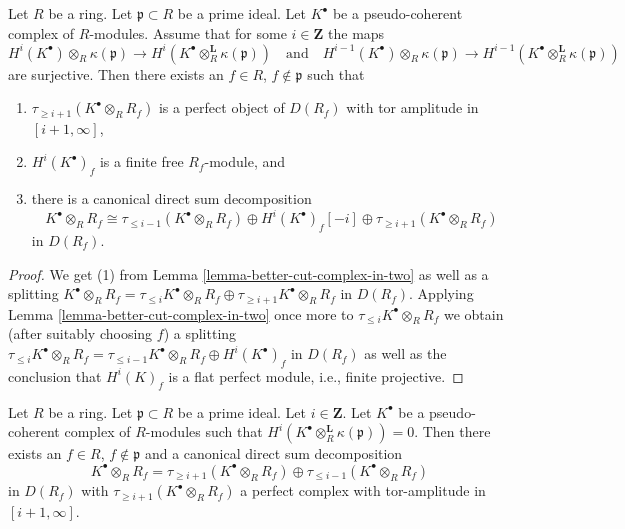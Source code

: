 \begin{lemma}
\label{lemma-isolate-a-cohomology-group}
Let $R$ be a ring. Let $\mathfrak p \subset R$ be a prime ideal.
Let $K^\bullet$ be a pseudo-coherent complex of $R$-modules.
Assume that for some $i \in \mathbf{Z}$ the maps
$$
H^i(K^\bullet) \otimes_R \kappa(\mathfrak p)
\longrightarrow
H^i(K^\bullet \otimes_R^{\mathbf{L}} \kappa(\mathfrak p))
\quad\text{and}\quad
H^{i - 1}(K^\bullet) \otimes_R \kappa(\mathfrak p)
\longrightarrow
H^{i - 1}(K^\bullet \otimes_R^{\mathbf{L}} \kappa(\mathfrak p))
$$
are surjective. Then there exists an $f \in R$, $f \not \in \mathfrak p$
such that
\begin{enumerate}
\item $\tau_{\geq i + 1}(K^\bullet \otimes_R R_f)$ is a perfect
object of $D(R_f)$ with tor amplitude in $[i + 1, \infty]$,
\item $H^i(K^\bullet)_f$ is a finite free $R_f$-module, and
\item there is a canonical direct sum decomposition
$$
K^\bullet \otimes_R R_f \cong
\tau_{\leq i - 1}(K^\bullet \otimes_R R_f) \oplus
H^i(K^\bullet)_f[-i] \oplus
\tau_{\geq i + 1}(K^\bullet \otimes_R R_f)
$$
in $D(R_f)$.
\end{enumerate}
\end{lemma}

\begin{proof}
We get (1) from Lemma \ref{lemma-better-cut-complex-in-two} as well
as a splitting
$K^\bullet \otimes_R R_f = \tau_{\leq i}K^\bullet \otimes_R R_f \oplus
\tau_{\geq i + 1}K^\bullet \otimes_R R_f$
in $D(R_f)$. Applying Lemma \ref{lemma-better-cut-complex-in-two} once
more to $\tau_{\leq i}K^\bullet \otimes_R R_f$
we obtain (after suitably choosing $f$) a splitting
$\tau_{\leq i}K^\bullet \otimes_R R_f =
\tau_{\leq i - 1}K^\bullet \otimes_R R_f \oplus H^i(K^\bullet)_f$ in $D(R_f)$
as well as the conclusion that $H^i(K)_f$ is a flat perfect module, i.e.,
finite projective.
\end{proof}

\begin{lemma}
\label{lemma-cut-complex-in-two}
Let $R$ be a ring. Let $\mathfrak p \subset R$ be a prime ideal.
Let $i \in \mathbf{Z}$. Let $K^\bullet$ be a pseudo-coherent complex
of $R$-modules such that
$H^i(K^\bullet \otimes_R^{\mathbf{L}} \kappa(\mathfrak p)) = 0$.
Then there exists an $f \in R$, $f \not \in \mathfrak p$
and a canonical direct sum decomposition
$$
K^\bullet \otimes_R R_f =
\tau_{\geq i + 1}(K^\bullet \otimes_R R_f) \oplus
\tau_{\leq i - 1}(K^\bullet \otimes_R R_f)
$$
in $D(R_f)$ with $\tau_{\geq i + 1}(K^\bullet \otimes_R R_f)$ a perfect
complex with tor-amplitude in $[i + 1, \infty]$.
\end{lemma}

